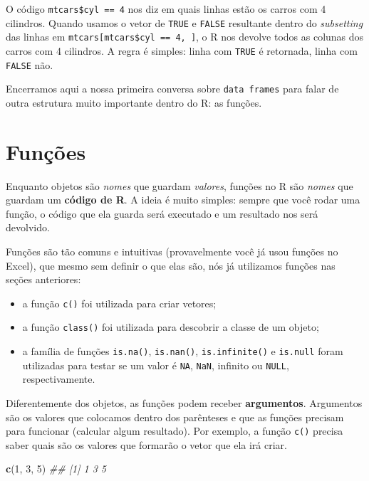 \documentclass[]{book}
\newenvironment{Shaded}{\begin{snugshade}}{\end{snugshade}}
\newcommand{\CommentTok}[1]{\textcolor[rgb]{0.56,0.35,0.01}{\textit{#1}}}
\newcommand{\DecValTok}[1]{\textcolor[rgb]{0.00,0.00,0.81}{#1}}
\newcommand{\KeywordTok}[1]{\textcolor[rgb]{0.13,0.29,0.53}{\textbf{#1}}}
\newcommand{\NormalTok}[1]{#1}
\providecommand{\tightlist}{%
  \setlength{\itemsep}{0pt}\setlength{\parskip}{0pt}}
\begin{document}
O código \texttt{mtcars\$cyl\ ==\ 4} nos diz em quais linhas estão os carros com 4 cilindros. Quando usamos o vetor de \texttt{TRUE} e \texttt{FALSE} resultante dentro do \emph{subsetting} das linhas em \texttt{mtcars{[}mtcars\$cyl\ ==\ 4,\ {]}}, o R nos devolve todos as colunas dos carros com 4 cilindros. A regra é simples: linha com \texttt{TRUE} é retornada, linha com \texttt{FALSE} não.

Encerramos aqui a nossa primeira conversa sobre \texttt{data\ frames} para falar de outra estrutura muito importante dentro do R: as funções.

\hypertarget{funcoes}{%
\section{Funções}\label{funcoes}}

Enquanto objetos são \emph{nomes} que guardam \emph{valores}, funções no R são \emph{nomes} que guardam um \textbf{código de R}. A ideia é muito simples: sempre que você rodar uma função, o código que ela guarda será executado e um resultado nos será devolvido.

Funções são tão comuns e intuitivas (provavelmente você já usou funções no Excel), que mesmo sem definir o que elas são, nós já utilizamos funções nas seções anteriores:

\begin{itemize}
\tightlist
\item
  a função \texttt{c()} foi utilizada para criar vetores;
\item
  a função \texttt{class()} foi utilizada para descobrir a classe de um objeto;
\item
  a família de funções \texttt{is.na()}, \texttt{is.nan()}, \texttt{is.infinite()} e \texttt{is.null} foram utilizadas para testar se um valor é \texttt{NA}, \texttt{NaN}, infinito ou \texttt{NULL}, respectivamente.
\end{itemize}

Diferentemente dos objetos, as funções podem receber \textbf{argumentos}. Argumentos são os valores que colocamos dentro dos parênteses e que as funções precisam para funcionar (calcular algum resultado). Por exemplo, a função \texttt{c()} precisa saber quais são os valores que formarão o vetor que ela irá criar.

\begin{Shaded}
\begin{Highlighting}[]
\KeywordTok{c}\NormalTok{(}\DecValTok{1}\NormalTok{, }\DecValTok{3}\NormalTok{, }\DecValTok{5}\NormalTok{)}
\CommentTok{## [1] 1 3 5}
\end{Highlighting}
\end{Shaded}
\end{document}
